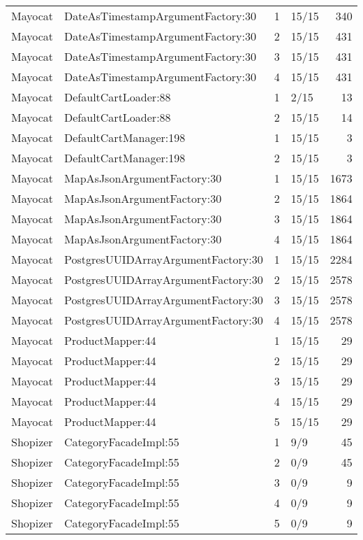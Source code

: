\begin{table}
{\begin{tabular}{|l|l|r|l|r|}
    Mayocat & DateAsTimestampArgumentFactory:30 & 1 & 15/15 & 340 \\
    Mayocat & DateAsTimestampArgumentFactory:30 & 2 & 15/15 & 431 \\
    Mayocat & DateAsTimestampArgumentFactory:30 & 3 & 15/15 & 431 \\
    Mayocat & DateAsTimestampArgumentFactory:30 & 4 & 15/15 & 431 \\
    Mayocat & DefaultCartLoader:88 & 1 & 2/15 & 13 \\
    Mayocat & DefaultCartLoader:88 & 2 & 15/15 & 14 \\
    Mayocat & DefaultCartManager:198 & 1 & 15/15 & 3 \\
    Mayocat & DefaultCartManager:198 & 2 & 15/15 & 3 \\
    Mayocat & MapAsJsonArgumentFactory:30 & 1 & 15/15 & 1673 \\
    Mayocat & MapAsJsonArgumentFactory:30 & 2 & 15/15 & 1864 \\
    Mayocat & MapAsJsonArgumentFactory:30 & 3 & 15/15 & 1864 \\
    Mayocat & MapAsJsonArgumentFactory:30 & 4 & 15/15 & 1864 \\
    Mayocat & PostgresUUIDArrayArgumentFactory:30 & 1 & 15/15 & 2284 \\
    Mayocat & PostgresUUIDArrayArgumentFactory:30 & 2 & 15/15 & 2578 \\
    Mayocat & PostgresUUIDArrayArgumentFactory:30 & 3 & 15/15 & 2578 \\
    Mayocat & PostgresUUIDArrayArgumentFactory:30 & 4 & 15/15 & 2578 \\
    Mayocat & ProductMapper:44 & 1 & 15/15 & 29 \\
    Mayocat & ProductMapper:44 & 2 & 15/15 & 29 \\
    Mayocat & ProductMapper:44 & 3 & 15/15 & 29 \\
    Mayocat & ProductMapper:44 & 4 & 15/15 & 29 \\
    Mayocat & ProductMapper:44 & 5 & 15/15 & 29 \\
    \hline
    Shopizer & CategoryFacadeImpl:55 & 1 & 9/9 & 45 \\
    Shopizer & CategoryFacadeImpl:55 & 2 & 0/9 & 45 \\
    Shopizer & CategoryFacadeImpl:55 & 3 & 0/9 & 9 \\
    Shopizer & CategoryFacadeImpl:55 & 4 & 0/9 & 9 \\
    Shopizer & CategoryFacadeImpl:55 & 5 & 0/9 & 9 \\

\end{tabular}}
\end{table}
